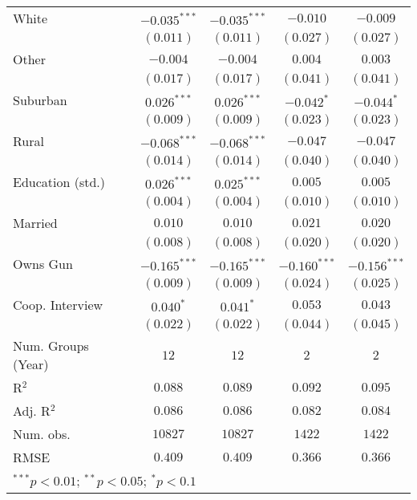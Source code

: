 \begin{table}
\begin{center}
\begin{tabular}{l c c c c}
White                   & $-0.035^{***}$ & $-0.035^{***}$ & $-0.010$       & $-0.009$       \\
                        & $(0.011)$      & $(0.011)$      & $(0.027)$      & $(0.027)$      \\
Other                   & $-0.004$       & $-0.004$       & $0.004$        & $0.003$        \\
                        & $(0.017)$      & $(0.017)$      & $(0.041)$      & $(0.041)$      \\
Suburban                & $0.026^{***}$  & $0.026^{***}$  & $-0.042^{*}$   & $-0.044^{*}$   \\
                        & $(0.009)$      & $(0.009)$      & $(0.023)$      & $(0.023)$      \\
Rural                   & $-0.068^{***}$ & $-0.068^{***}$ & $-0.047$       & $-0.047$       \\
                        & $(0.014)$      & $(0.014)$      & $(0.040)$      & $(0.040)$      \\
Education (std.)        & $0.026^{***}$  & $0.025^{***}$  & $0.005$        & $0.005$        \\
                        & $(0.004)$      & $(0.004)$      & $(0.010)$      & $(0.010)$      \\
Married                 & $0.010$        & $0.010$        & $0.021$        & $0.020$        \\
                        & $(0.008)$      & $(0.008)$      & $(0.020)$      & $(0.020)$      \\
Owns Gun                & $-0.165^{***}$ & $-0.165^{***}$ & $-0.160^{***}$ & $-0.156^{***}$ \\
                        & $(0.009)$      & $(0.009)$      & $(0.024)$      & $(0.025)$      \\
Coop. Interview         & $0.040^{*}$    & $0.041^{*}$    & $0.053$        & $0.043$        \\
                        & $(0.022)$      & $(0.022)$      & $(0.044)$      & $(0.045)$      \\
\midrule
Num. Groups (Year)      & $12$           & $12$           & $2$            & $2$            \\
R$^2$                   & $0.088$        & $0.089$        & $0.092$        & $0.095$        \\
Adj. R$^2$              & $0.086$        & $0.086$        & $0.082$        & $0.084$        \\
Num. obs.               & $10827$        & $10827$        & $1422$         & $1422$         \\
RMSE                    & $0.409$        & $0.409$        & $0.366$        & $0.366$        \\
\bottomrule
\multicolumn{5}{l}{\scriptsize{$^{***}p<0.01$; $^{**}p<0.05$; $^{*}p<0.1$}}
\end{tabular}
\label{table_school}
\end{center}
\end{table}
